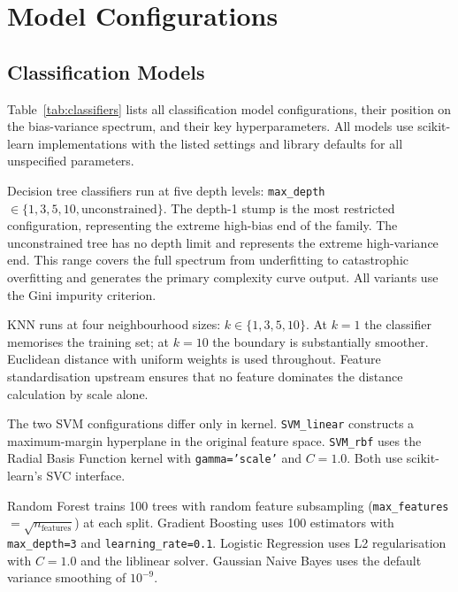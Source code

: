 \documentclass[conference]{IEEEtran}
\begin{document}
\section{Model Configurations}

\subsection{Classification Models}

Table~\ref{tab:classifiers} lists all classification model configurations, their position on the bias-variance spectrum, and their key hyperparameters. All models use scikit-learn implementations with the listed settings and library defaults for all unspecified parameters.

Decision tree classifiers run at five depth levels: \texttt{max\_depth} $\in \{1, 3, 5, 10, \text{unconstrained}\}$. The depth-1 stump is the most restricted configuration, representing the extreme high-bias end of the family. The unconstrained tree has no depth limit and represents the extreme high-variance end. This range covers the full spectrum from underfitting to catastrophic overfitting and generates the primary complexity curve output. All variants use the Gini impurity criterion.

KNN runs at four neighbourhood sizes: $k \in \{1, 3, 5, 10\}$. At $k=1$ the classifier memorises the training set; at $k=10$ the boundary is substantially smoother. Euclidean distance with uniform weights is used throughout. Feature standardisation upstream ensures that no feature dominates the distance calculation by scale alone.

The two SVM configurations differ only in kernel. \texttt{SVM\_linear} constructs a maximum-margin hyperplane in the original feature space. \texttt{SVM\_rbf} uses the Radial Basis Function kernel with \texttt{gamma='scale'} and $C=1.0$. Both use scikit-learn's SVC interface.

Random Forest trains 100 trees with random feature subsampling (\texttt{max\_features} $= \sqrt{n_{\text{features}}}$) at each split. Gradient Boosting uses 100 estimators with \texttt{max\_depth=3} and \texttt{learning\_rate=0.1}. Logistic Regression uses L2 regularisation with $C=1.0$ and the liblinear solver. Gaussian Naive Bayes uses the default variance smoothing of $10^{-9}$.
\end{document}
